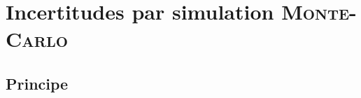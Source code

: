 \documentclass[a4paper, 12pt, garamond]{book}
\begin{document}
\setcounter{chapter}{4}

\chapter{Incertitudes par simulation \textsc{Monte-Carlo}}

\section{Principe}
\end{document}
